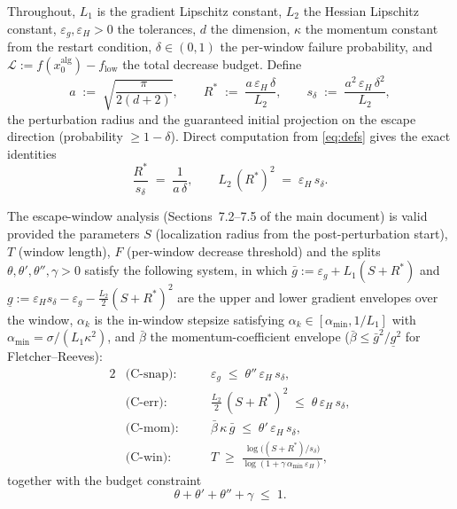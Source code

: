 \documentclass[11pt,a4paper]{article}
\theoremstyle{plain}
\theoremstyle{definition}
\newcommand{\eps}{\varepsilon}
\newcommand{\epsg}{\eps_{g}}
\newcommand{\epsH}{\eps_{H}}
\newcommand{\Lone}{L_{1}}
\newcommand{\sdel}{s_{\delta}}
\newcommand{\glow}{\underline{g}}
\newcommand{\LL}{\mathcal{L}}
\newcommand{\Rstar}{R^{*}}
\newcommand{\gup}{\bar g}
\newcommand{\bbeta}{\bar\beta}
\newcommand{\amin}{\alpha_{\min}}
\begin{document}
Throughout, $L_1$ is the gradient Lipschitz constant, $L_2$ the Hessian
Lipschitz constant, $\epsg,\epsH>0$ the tolerances, $d$ the dimension,
$\kappa$ the momentum constant from the restart condition, $\delta\in(0,1)$
the per-window failure probability, and $\LL := f(x_0^{\mathrm{alg}}) -
f_{\mathrm{low}}$ the total decrease budget. Define
\begin{equation}\label{eq:defs}
a \;:=\; \sqrt{\frac{\pi}{2(d+2)}}, \qquad
\Rstar \;:=\; \frac{a\,\epsH\,\delta}{L_2}, \qquad
\sdel \;:=\; \frac{a^2\,\epsH\,\delta^2}{L_2},
\end{equation}
the perturbation radius and the guaranteed initial projection on the escape
direction (probability $\ge 1-\delta$). Direct computation from
\eqref{eq:defs} gives the exact identities
\begin{equation}\label{eq:identities}
\frac{\Rstar}{\sdel} \;=\; \frac{1}{a\,\delta}, \qquad
L_2\,(\Rstar)^2 \;=\; \epsH\,\sdel .
\end{equation}

The escape-window analysis (Sections~7.2--7.5 of the main document) is valid
provided the parameters $S$ (localization radius from the post-perturbation
start), $T$ (window length), $F$ (per-window decrease threshold) and the
splits $\theta,\theta',\theta'',\gamma>0$ satisfy the following system, in
which $\gup := \epsg + L_1(S+\Rstar)$ and
$\glow := \epsH\sdel - \epsg - \tfrac{L_2}{2}(S+\Rstar)^2$ are the upper and
lower gradient envelopes over the window, $\alpha_k$ is the in-window stepsize satisfying $\alpha_k \in [\amin, 1/\Lone]$ with $\amin = \sigma / (\Lone \kappa^2)$, and $\bbeta$ the momentum-coefficient envelope
($\bbeta \le \gup^2/\glow^2$ for Fletcher--Reeves):
\begin{alignat}{2}
&\text{(C-snap)}: \quad && \epsg \;\le\; \theta''\,\epsH\,\sdel,
\label{eq:Csnap}\\
&\text{(C-err)}: \quad && \frac{L_2}{2}\,(S+\Rstar)^2 \;\le\;
\theta\,\epsH\,\sdel, \label{eq:Cerr}\\
&\text{(C-mom)}: \quad && \bbeta\,\kappa\,\gup \;\le\;
\theta'\,\epsH\,\sdel, \label{eq:Cmom}\\
&\text{(C-win)}: \quad && T \;\ge\;
\frac{\log\!\big((S+\Rstar)/\sdel\big)}{\log(1+\gamma\,\amin\,\epsH)},
\label{eq:Cwin}
\end{alignat}
together with the budget constraint
\begin{equation}\label{eq:budget}
\theta + \theta' + \theta'' + \gamma \;\le\; 1 .
\end{equation}
\end{document}
